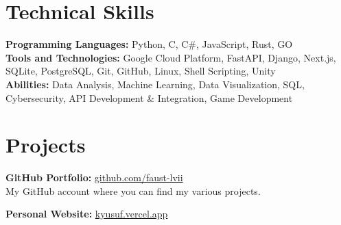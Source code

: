 \documentclass[10pt,a4paper]{extarticle}
\begin{document}
\section{Technical Skills}
\textbf{Programming Languages:} Python, C, C\#, JavaScript, Rust, GO\\
\textbf{Tools and Technologies:} Google Cloud Platform, FastAPI, Django, Next.js, SQLite, PostgreSQL, Git, GitHub, Linux, Shell Scripting, Unity\\
\textbf{Abilities:} Data Analysis, Machine Learning, Data Visualization, SQL, Cybersecurity, API Development \& Integration, Game Development

\section{Projects}
\textbf{GitHub Portfolio:} \href{https://github.com/faust-lvii}{github.com/faust-lvii}\\
My GitHub account where you can find my various projects.

\textbf{Personal Website:} \href{https://kyusuf.vercel.app}{kyusuf.vercel.app}
\end{document}
